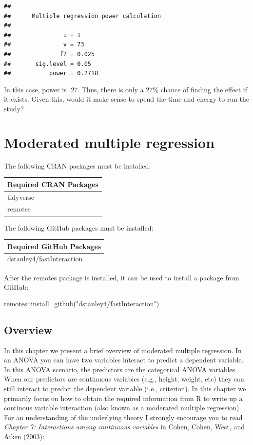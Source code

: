 \documentclass[
]{krantz}
\makeatletter
\newenvironment{Shaded}{\begin{snugshade}}{\end{snugshade}}
\newcommand{\FunctionTok}[1]{\textcolor[rgb]{0,0,0}{#1}}
\newcommand{\NormalTok}[1]{#1}
\newcommand{\SpecialCharTok}[1]{\textcolor[rgb]{0,0,0}{#1}}
\newcommand{\StringTok}[1]{\textcolor[rgb]{0.5,0.5,0.5}{#1}}
\newenvironment{kframe}{%
\medskip{}
\setlength{\fboxsep}{.8em}
 \def\at@end@of@kframe{}%
 \ifinner\ifhmode%
  \def\at@end@of@kframe{\end{minipage}}%
  \begin{minipage}{\columnwidth}%
 \fi\fi%
 \def\FrameCommand##1{\hskip\@totalleftmargin \hskip-\fboxsep
 \colorbox{shadecolor}{##1}\hskip-\fboxsep
     \hskip-\linewidth \hskip-\@totalleftmargin \hskip\columnwidth}%
 \MakeFramed {\advance\hsize-\width
   \@totalleftmargin\z@ \linewidth\hsize
   \@setminipage}}%
 {\par\unskip\endMakeFramed%
 \at@end@of@kframe}
\renewenvironment{Shaded}{\begin{kframe}}{\end{kframe}}
\makeatother
\begin{document}
\begin{verbatim}
## 
##      Multiple regression power calculation 
## 
##               u = 1
##               v = 73
##              f2 = 0.025
##       sig.level = 0.05
##           power = 0.2718
\end{verbatim}

In this case, power is .27. Thus, there is only a 27\% chance of finding the effect if it exists. Given this, would it make sense to spend the time and energy to run the study?

\hypertarget{moderated-multiple-regression}{%
\chapter{Moderated multiple regression}\label{moderated-multiple-regression}}

The following CRAN packages must be installed:

\begin{longtable}[]{@{}l@{}}
\toprule
Required CRAN Packages \\
\midrule
\endhead
tidyverse \\
remotes \\
\bottomrule
\end{longtable}

The following GitHub packages must be installed:

\begin{longtable}[]{@{}l@{}}
\toprule
Required GitHub Packages \\
\midrule
\endhead
dstanley4/fastInteraction \\
\bottomrule
\end{longtable}

After the remotes package is installed, it can be used to install a package from GitHub:

\begin{Shaded}
\begin{Highlighting}[]
\NormalTok{remotes}\SpecialCharTok{::}\FunctionTok{install\_github}\NormalTok{(}\StringTok{"dstanley4/fastInteraction"}\NormalTok{)}
\end{Highlighting}
\end{Shaded}

\hypertarget{overview-8}{%
\section{Overview}\label{overview-8}}

In this chapter we present a brief overview of moderated multiple regression. In an ANOVA you can have two variables interact to predict a dependent variable. In this ANOVA scenario, the predictors are the categorical ANOVA variables. When our predictors are continuous variables (e.g., height, weight, etc) they can still interact to predict the dependent variable (i.e., criterion). In this chapter we primarily focus on how to obtain the required information from R to write up a continous variable interaction (also known as a moderated multiple regression). For an understanding of the underlying theory I strongly encourage you to read \emph{Chapter 7: Interactions among continuous variables} in Cohen, Cohen, West, and Aiken (2003):
\end{document}
